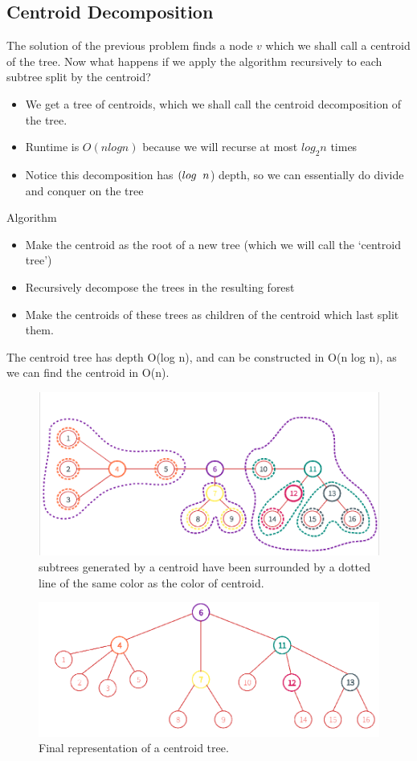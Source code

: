 \documentclass[12pt]{article}
\begin{document}
\subsection{Centroid Decomposition}
The solution of the previous problem finds a node $v$ which we shall call a
centroid of the tree. Now what happens if we apply the algorithm
recursively to each subtree split by the centroid?
\begin{itemize}
    \item We get a tree of centroids, which we shall call the centroid
decomposition of the tree.
    \item Runtime is $O(n log n)$ because we will recurse at most $log_2 n$ times
    \item Notice this decomposition has $(log\hspace{0.2cm} n$) depth, so we can essentially do divide and conquer on the tree
\end{itemize}
 Algorithm
\begin{itemize}
    \item  Make the centroid as the root of a new tree (which we will call the ‘centroid tree’)
    \item Recursively decompose the trees in the resulting forest
    \item Make the centroids of these trees as children of the centroid which last split them.
\end{itemize}
The centroid tree has depth O(log n), and can be constructed in O(n log n), as we can find the centroid in O(n).
\begin{figure}[H]
  \centering
  \includegraphics[width=\linewidth]{cd4.png}
  \caption{subtrees generated by a centroid have been surrounded by a dotted line of the same color as the color of centroid. \cite{9} }
\end{figure}
\begin{figure}[H]
  \centering
  \includegraphics[width=\linewidth]{cd5.png}
  \caption{Final representation of a centroid tree.\cite{9} }
\end{figure}
    
\end{document}
